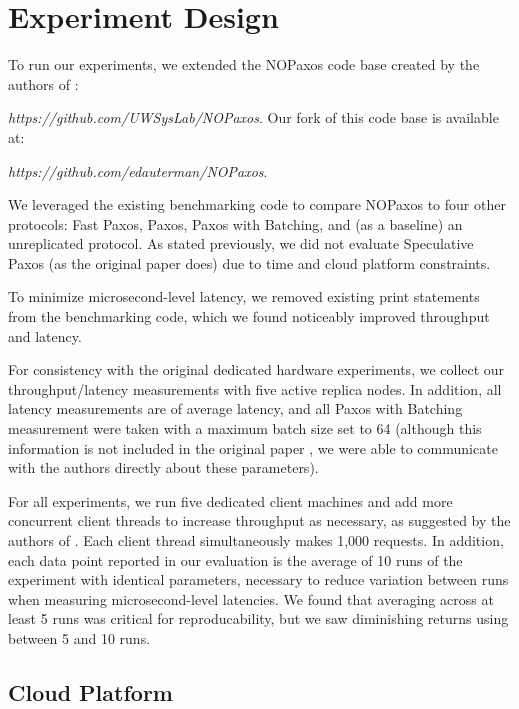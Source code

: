 \section{Experiment Design}

To run our experiments, we extended the NOPaxos code base created by the authors of \cite{nopaxos}: 
\par \quad \textit{https://github.com/UWSysLab/NOPaxos}.
\newline
Our fork of this code base is available at: 
\par \quad \textit{https://github.com/edauterman/NOPaxos}. 
\newline
\par We leveraged the existing benchmarking code to compare NOPaxos to four other protocols: Fast Paxos, Paxos, Paxos with Batching, and (as a baseline) an unreplicated protocol. As stated previously, we did not evaluate Speculative Paxos (as the original paper does) due to time and cloud platform constraints. 

To minimize microsecond-level latency, we removed existing print statements from the benchmarking code, which we found noticeably improved throughput and latency. 

For consistency with the original dedicated hardware experiments, we collect our throughput/latency measurements with five active replica nodes. In addition, all latency measurements are of average latency, and all Paxos with Batching measurement were taken with a maximum batch size set to 64 (although this information is not included in the original paper \cite{nopaxos}, we were able to communicate with the authors directly about these parameters).

For all experiments, we run five dedicated client machines and add more concurrent client threads to increase throughput as necessary, as suggested by the authors of \cite{nopaxos}. Each client thread simultaneously makes 1,000 requests. In addition, each data point reported in our evaluation is the average of 10 runs of the experiment with identical parameters, necessary to reduce variation between runs when measuring microsecond-level latencies. We found that averaging across at least 5 runs was critical for reproducability, but we saw diminishing returns using between 5 and 10 runs. 


\subsection{Cloud Platform}

